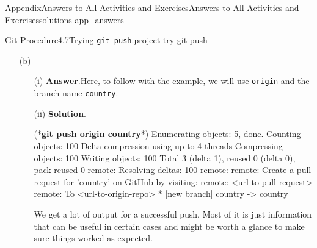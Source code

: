 \documentclass[oneside,10pt,]{book}
\newcommand{\blocktitlefont}{\relax}
\newcommand{\mono}[1]{\texttt{#1}}
\newcommand{\consoleinput}[1]{\textbf{#1}}
\begin{document}
\begin{solutions-chapter}{Appendix}{Answers to All Activities and Exercises}{}{Answers to All Activities and Exercises}{}{}{solutions-app_answers}
\begin{projectsolution}{Git Procedure}{4.7}{Trying \mono{git push}.}{project-try-git-push}
\begin{enumerate}[font=\bfseries,label=(\alph*),ref=\alph*]
\begin{enumerate}[font=\bfseries,label=(\roman*),ref=\theenumi.\roman*]
\begin{console}{0}{1}{0}
    git push --set-upstream origin country
\end{console}
Well, look at that, the same error. This should make sense. You are telling Git to push changes to the origin repo but \mono{country}, the current branch, doesn't have an origin since we created the branch locally.%
\item[(iii)]\noindent\textbf{\blocktitlefont Solution}.\hypertarget{solution-try-git-push-c-d-b-back}{}\quad{}\begin{console}{0}{1}{0}
(*\consoleinput{git push country}*)
fatal: 'country' does not appear to be a git repository
fatal: Could not read from remote repository.

Please make sure you have the correct access rights
and the repository exists.
\end{console}
Remember the four parts to \mono{git push}? Well since we forgot Step 3, the remote name, Git assumes that the word ``country'' is the name of the repo we want to push to. Since there is no repo named ``country'' on your computer nor on GitHub, it doens't know where to push and errors out.%
\end{enumerate}%
\item[(b)]\begin{enumerate}[font=\bfseries,label=(\roman*),ref=\theenumi.\roman*]%
\item[(i)]\noindent\textbf{\blocktitlefont Answer}.\hypertarget{answer-try-git-push-d-b-b-back}{}\quad{}Here, to follow with the example, we will use \mono{origin} and the branch name \mono{country}.%
\item[(ii)]\noindent\textbf{\blocktitlefont Solution}.\hypertarget{solution-try-git-push-d-c-b-back}{}\quad{}\begin{console}{0}{1}{0}
(*\consoleinput{git push origin country}*)
Enumerating objects: 5, done.
Counting objects: 100%
Delta compression using up to 4 threads
Compressing objects: 100%
Writing objects: 100%
Total 3 (delta 1), reused 0 (delta 0), pack-reused 0
remote: Resolving deltas: 100%
remote: 
remote: Create a pull request for 'country' on GitHub by visiting:
remote:      <url-to-pull-request>
remote: 
To <url-to-origin-repo>
 * [new branch]      country -> country
\end{console}
We get a lot of output for a successful push. Most of it is just information that can be useful in certain cases and might be worth a glance to make sure things worked as expected.%
\end{enumerate}%

\end{enumerate}
\end{projectsolution}
\end{solutions-chapter}
\end{document}
